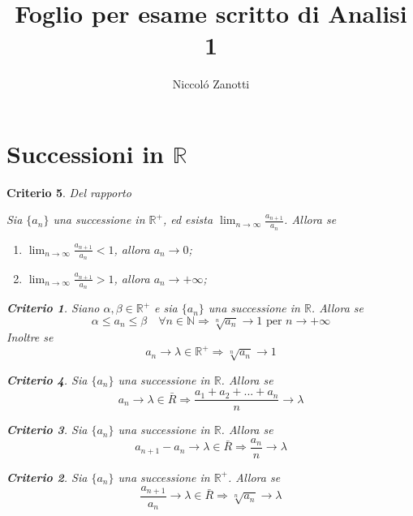 \documentclass[a4paper, titlepage]{report}%
\theoremstyle{definition} %
\theoremstyle{plain}
\theoremstyle{plain}
\theoremstyle{remark}
\theoremstyle{remark}
\theoremstyle{plain}
\newtheorem*{criterio}{Criterio}
\theoremstyle{plain}
\theoremstyle{plain}
\theoremstyle{plain}
\theoremstyle{plain}
\begin{document}
    \title{Foglio per esame scritto di Analisi 1}
    \author{Niccol\'o Zanotti}
    \maketitle


\section*{Successioni in $\mathbb{R}$}
\begin{criterio}{Del rapporto}

    Sia ${\{ a_n \}}$ una successione in $\mathbb{R^+}$, ed esista
     $\lim_{n \to \infty} \frac{a_{n+1}}{a_n}$. Allora se 
     \begin{enumerate}
         \item $\lim_{n \to \infty} \frac{a_{n+1}}{a_n} < 1$,
               allora $a_n \rightarrow 0$;
        \item $\lim_{n \to \infty} \frac{a_{n+1}}{a_n} > 1$,
        allora $a_n \rightarrow +\infty$;
     \end{enumerate}
\begin{criterio}{}
    
    Siano $\alpha,\beta \in \mathbb{R^+}$ e sia ${\{ a_n \}}$ 
    una successione in $\mathbb{R}$. Allora se
\[
    \alpha \leq a_n \leq \beta \quad \forall n \in \mathbb{N}  
    \Longrightarrow \sqrt[n]{a_n} \rightarrow 1 \text{ per }
     n \rightarrow +\infty
\]
Inoltre se
\[
    a_n \rightarrow \lambda \in \mathbb{R^+} \Longrightarrow 
    \sqrt[n]{a_n} \rightarrow 1
\]
\end{criterio}
\begin{criterio}{}
    
    Sia $\{a_n\}$ una successione in $\mathbb{R}$. Allora se
\[
     a_n \rightarrow \lambda \in \bar{R} \Longrightarrow 
     \frac{a_1+a_2+ ... + a_n}{n} \rightarrow \lambda  
\]
\begin{criterio}
    
    Sia $\{a_n\}$ una successione in $\mathbb{R}$. Allora se
\[
     a_{n+1}-a_n \rightarrow \lambda \in \bar{R} \Longrightarrow 
     \frac{a_n}{n} \rightarrow \lambda       
\]
\begin{criterio}
    
    Sia $\{a_n\}$ una successione in $\mathbb{R^+}$. Allora se
\[
     \frac{a_{n+1}}{a_n} \rightarrow \lambda \in \bar{R} \Longrightarrow
     \sqrt[n]{a_n} \rightarrow \lambda    
\]

\end{criterio}
    
\end{criterio}


\end{criterio}

   

\end{criterio}
\end{document}
